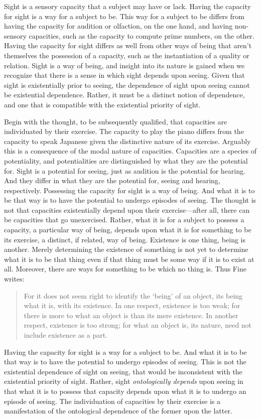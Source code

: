 \documentclass[12pt]{article}
\begin{document}
Sight is a sensory capacity that a subject may have or lack. Having the capacity for sight is a way for a subject to be. This way for a subject to be differs from having the capacity for audition or olfaction, on the one hand, and having non-sensory capacities, such as the capacity to compute prime numbers, on the other. Having the capacity for sight differs as well from other ways of being that aren't themselves the possession of a capacity, such as the instantiation of a quality or relation. Sight is a way of being, and insight into its nature is gained when we recognize that there is a sense in which sight depends upon seeing. Given that sight is existentially prior to seeing, the dependence of sight upon seeing cannot be existential dependence. Rather, it must be a distinct notion of dependence, and one that is compatible with the existential priority of sight.

Begin with the thought, to be subsequently qualified, that capacities are individuated by their exercise. The capacity to play the piano differs from the capacity to speak Japanese given the distinctive nature of its exercise. Arguably this is a consequence of the modal nature of capacities. Capacities are a species of potentiality, and potentialities are distinguished by what they are the potential for. Sight is a potential for seeing, just as audition is the potential for hearing. And they differ in what they are the potential for, seeing and hearing, respectively. Possessing the capacity for sight is a way of being. And what it is to be that way is to have the potential to undergo episodes of seeing. The thought is not that capacities existentially depend upon their exercise---after all, there can be capacities that go unexercised. Rather, what it is for a subject to possess a capacity, a particular way of being, depends upon what it is for something to be its exercise, a distinct, if related, way of being. Existence is one thing, being is another. Merely determining the existence of something is not yet to determine what it is to be that thing even if that thing must be some way if it is to exist at all. Moreover, there are ways for something to be which no thing is. Thus Fine writes:
\begin{quote}
	For it does not seem right to identify the `being' of an object, its being what it is, with its existence. In one respect, existence is too weak; for there is more to what an object is than its mere existence. In another respect, existence is too strong; for what an object is, its nature, need not include existence as a part. \citep[274]{Fine:1995ls}
\end{quote}
Having the capacity for sight is a way for a subject to be. And what it is to be that way is to have the potential to undergo episodes of seeing. This is not the existential dependence of sight on seeing, that would be inconsistent with the existential priority of sight. Rather, sight \emph{ontologically depends} upon seeing in that what it is to possess that capacity depends upon what it is to undergo an episode of seeing. The individuation of capacities by their exercise is a manifestation of the ontological dependence of the former upon the latter.
\end{document}
